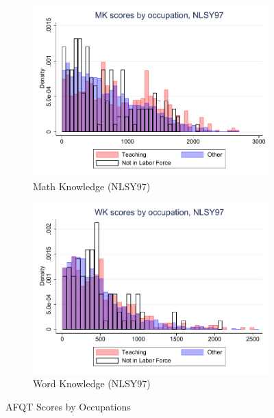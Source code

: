 \documentclass[onehalfspacing,11pt]{article}
\begin{document}
\begin{figure}
\begin{subfigure}{0.49\textwidth}
			\includegraphics[width=\linewidth]{NLSY97_MK_occ.pdf}
			\caption{Math Knowledge (NLSY97)} \label{fig:nlsy97math}
		\end{subfigure}
		\hspace*{\fill} %
		\begin{subfigure}{0.49\textwidth}
			\includegraphics[width=\linewidth]{NLSY97_WK_occ.pdf}
			\caption{Word Knowledge (NLSY97)} \label{fig:nlsy97wprd}
		\end{subfigure}
		
		\caption{AFQT Scores by Occupations}
		\label{fig:nlsy_by_occ}
	\end{figure}
	
	
\end{document}
